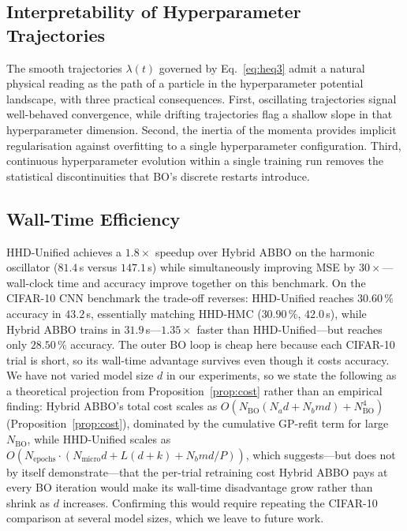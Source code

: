 \documentclass[11pt]{article}
\theoremstyle{definition}
\begin{document}
\subsection{Interpretability of Hyperparameter Trajectories}

The smooth trajectories $\lambda(t)$ governed by Eq.~\eqref{eq:heq3}
admit a natural physical reading as the path of a particle in the
hyperparameter potential landscape, with three practical
consequences. First, oscillating trajectories signal well-behaved
convergence, while drifting trajectories flag a shallow slope in that
hyperparameter dimension. Second, the inertia of the momenta
provides implicit regularisation against overfitting to a single
hyperparameter configuration. Third, continuous hyperparameter
evolution within a single training run removes the statistical
discontinuities that BO's discrete restarts introduce.

\subsection{Wall-Time Efficiency}

HHD-Unified achieves a $1.8\times$ speedup over Hybrid ABBO on the harmonic
oscillator ($81.4$\,s versus $147.1$\,s) while simultaneously
improving MSE by $30\times$---wall-clock time and accuracy improve
together on this benchmark. On the CIFAR-10 CNN benchmark the
trade-off reverses: HHD-Unified reaches $30.60\,\%$ accuracy in
$43.2$\,s, essentially matching HHD-HMC ($30.90\,\%$, $42.0$\,s),
while Hybrid ABBO trains in $31.9$\,s---$1.35\times$ faster than
HHD-Unified---but reaches only $28.50\,\%$ accuracy. The outer BO loop
is cheap here because each CIFAR-10 trial is short, so its wall-time
advantage survives even though it costs accuracy. We have not varied
model size $d$ in our experiments, so we state the following as a
theoretical projection from Proposition~\ref{prop:cost} rather than
an empirical finding: Hybrid ABBO's total cost scales as
$O\!\left(N_{\mathrm{BO}}(N_a d + N_b md) + N_{\mathrm{BO}}^4\right)$
(Proposition~\ref{prop:cost}), dominated by the cumulative
GP-refit term for large $N_{\mathrm{BO}}$, while HHD-Unified
scales as
$O(N_{\mathrm{epochs}}\cdot(N_{\mathrm{micro}}d+L(d+k)+N_b md/P))$,
which suggests---but does not by itself demonstrate---that the
per-trial retraining cost Hybrid ABBO pays at every BO iteration would
make its wall-time disadvantage grow rather than shrink as $d$
increases. Confirming this would require repeating the CIFAR-10
comparison at several model sizes, which we leave to future work.
\end{document}
